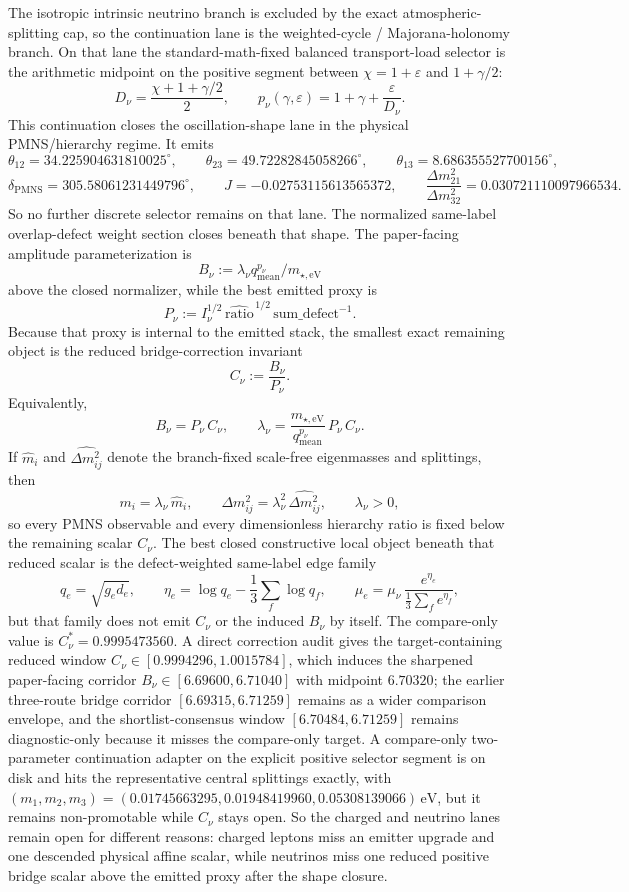 The isotropic intrinsic neutrino branch is excluded by the exact atmospheric-splitting cap, so the continuation lane is the weighted-cycle / Majorana-holonomy branch. On that lane the standard-math-fixed balanced transport-load selector is the arithmetic midpoint on the positive segment between \(\chi=1+\varepsilon\) and \(1+\gamma/2\):
\[
D_\nu=\frac{\chi+1+\gamma/2}{2},
\qquad
p_\nu(\gamma,\varepsilon)=1+\gamma+\frac{\varepsilon}{D_\nu}.
\]
This continuation closes the oscillation-shape lane in the physical PMNS/hierarchy regime. It emits
\[
\theta_{12}=34.225904631810025^\circ,\qquad
\theta_{23}=49.72282845058266^\circ,\qquad
\theta_{13}=8.686355527700156^\circ,
\]
\[
\delta_{\mathrm{PMNS}}=305.58061231449796^\circ,\qquad
J=-0.02753115613565372,\qquad
\frac{\Delta m_{21}^2}{\Delta m_{32}^2}=0.030721110097966534.
\]
So no further discrete selector remains on that lane. The normalized same-label overlap-defect weight section closes beneath that shape. The paper-facing amplitude parameterization is
\[
B_\nu:=\lambda_\nu q_{\mathrm{mean}}^{p_\nu}/m_{\star,\mathrm{eV}}
\]
above the closed normalizer, while the best emitted proxy is
\[
P_\nu:=I_\nu^{1/2}\,\widehat{\mathrm{ratio}}^{\,1/2}\,\mathrm{sum\_defect}^{-1}.
\]
Because that proxy is internal to the emitted stack, the smallest exact remaining object is the reduced bridge-correction invariant
\[
C_\nu:=\frac{B_\nu}{P_\nu}.
\]
Equivalently,
\[
B_\nu=P_\nu\,C_\nu,
\qquad
\lambda_\nu=\frac{m_{\star,\mathrm{eV}}}{q_{\mathrm{mean}}^{p_\nu}}\,P_\nu\,C_\nu.
\]
If \(\hat m_i\) and \(\widehat{\Delta m_{ij}^2}\) denote the branch-fixed scale-free eigenmasses and splittings, then
\[
m_i=\lambda_\nu\,\hat m_i,
\qquad
\Delta m_{ij}^2=\lambda_\nu^2\,\widehat{\Delta m_{ij}^2},
\qquad
\lambda_\nu>0,
\]
so every PMNS observable and every dimensionless hierarchy ratio is fixed below the remaining scalar \(C_\nu\).
The best closed constructive local object beneath that reduced scalar is the defect-weighted same-label edge family
\[
q_e=\sqrt{g_e d_e},
\qquad
\eta_e=\log q_e-\frac13\sum_f \log q_f,
\qquad
\mu_e=\mu_\nu\,\frac{e^{\eta_e}}{\frac13\sum_f e^{\eta_f}},
\]
but that family does not emit \(C_\nu\) or the induced \(B_\nu\) by itself. The compare-only value is \(C_\nu^\ast=0.9995473560\). A direct correction audit gives the target-containing reduced window \(C_\nu\in[0.9994296,1.0015784]\), which induces the sharpened paper-facing corridor \(B_\nu\in[6.69600,6.71040]\) with midpoint \(6.70320\); the earlier three-route bridge corridor \([6.69315,6.71259]\) remains as a wider comparison envelope, and the shortlist-consensus window \([6.70484,6.71259]\) remains diagnostic-only because it misses the compare-only target. A compare-only two-parameter continuation adapter on the explicit positive selector segment is on disk and hits the representative central splittings exactly, with \((m_1,m_2,m_3)=(0.01745663295,0.01948419960,0.05308139066)\,\mathrm{eV}\), but it remains non-promotable while \(C_\nu\) stays open. So the charged and neutrino lanes remain open for different reasons: charged leptons miss an emitter upgrade and one descended physical affine scalar, while neutrinos miss one reduced positive bridge scalar above the emitted proxy after the shape closure.

